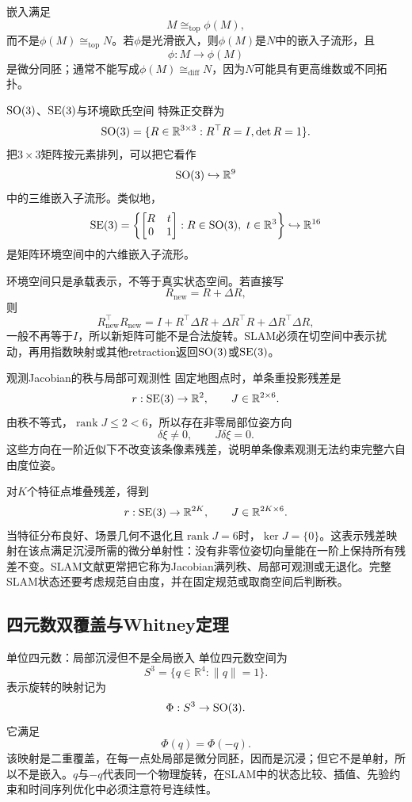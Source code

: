嵌入满足
\[
    M\cong_{\mathrm{top}}\phi(M),
\]
而不是$\phi(M)\cong_{\mathrm{top}}N$。若$\phi$是光滑嵌入，则$\phi(M)$是$N$中的嵌入子流形，且
\[
    \phi:M\to\phi(M)
\]
是微分同胚；通常不能写成$\phi(M)\cong_{\mathrm{diff}}N$，因为$N$可能具有更高维数或不同拓扑。

\begin{slamcase}{$\operatorname{SO}(3)$、$\operatorname{SE}(3)$与环境欧氏空间}
特殊正交群为
\[
    \operatorname{SO}(3)=\{R\in\mathbb R^{3\times3}:R^\top R=I,\det R=1\}.
\]
把$3\times3$矩阵按元素排列，可以把它看作
\[
    \operatorname{SO}(3)\hookrightarrow\mathbb R^9
\]
中的三维嵌入子流形。类似地，
\[
    \operatorname{SE}(3)=
    \left\{
    \begin{bmatrix}R&t\\0&1\end{bmatrix}
    :R\in\operatorname{SO}(3),\ t\in\mathbb R^3
    \right\}
    \hookrightarrow\mathbb R^{16}
\]
是矩阵环境空间中的六维嵌入子流形。

环境空间只是承载表示，不等于真实状态空间。若直接写
\[
    R_{\mathrm{new}}=R+\Delta R,
\]
则
\[
    R_{\mathrm{new}}^\top R_{\mathrm{new}}
    =I+R^\top\Delta R+\Delta R^\top R+\Delta R^\top\Delta R,
\]
一般不再等于$I$，所以新矩阵可能不是合法旋转。SLAM必须在切空间中表示扰动，再用指数映射或其他retraction返回$\operatorname{SO}(3)$或$\operatorname{SE}(3)$。
\end{slamcase}

\begin{slamcase}{观测Jacobian的秩与局部可观测性}
固定地图点时，单条重投影残差是
\[
    r:\operatorname{SE}(3)\to\mathbb R^2,
    \qquad J\in\mathbb R^{2\times6}.
\]
由秩不等式，$\operatorname{rank}J\le2<6$，所以存在非零局部位姿方向
\[
    \delta\xi\neq0,
    \qquad J\delta\xi=0.
\]
这些方向在一阶近似下不改变该条像素残差，说明单条像素观测无法约束完整六自由度位姿。

对$K$个特征点堆叠残差，得到
\[
    r:\operatorname{SE}(3)\to\mathbb R^{2K},
    \qquad J\in\mathbb R^{2K\times6}.
\]
当特征分布良好、场景几何不退化且$\operatorname{rank}J=6$时，$\ker J=\{0\}$。这表示残差映射在该点满足沉浸所需的微分单射性：没有非零位姿切向量能在一阶上保持所有残差不变。SLAM文献更常把它称为Jacobian满列秩、局部可观测或无退化。完整SLAM状态还要考虑规范自由度，并在固定规范或取商空间后判断秩。
\end{slamcase}

\subsection{四元数双覆盖与Whitney定理}

\begin{slamcase}{单位四元数：局部沉浸但不是全局嵌入}
单位四元数空间为
\[
    S^3=\{q\in\mathbb R^4:\|q\|=1\}.
\]
表示旋转的映射记为
\[
    \Phi:S^3\to\operatorname{SO}(3).
\]
它满足
\[
    \Phi(q)=\Phi(-q).
\]
该映射是二重覆盖，在每一点处局部是微分同胚，因而是沉浸；但它不是单射，所以不是嵌入。$q$与$-q$代表同一个物理旋转，在SLAM中的状态比较、插值、先验约束和时间序列优化中必须注意符号连续性。
\end{slamcase}


